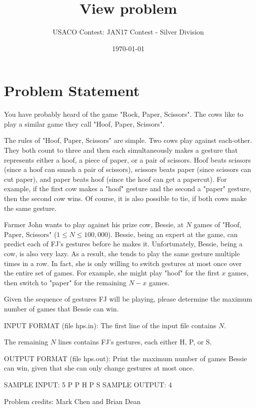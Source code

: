 \documentclass[12pt]{article}
\title{View problem}
\author{USACO Contest: JAN17 Contest - Silver Division}
\date{\today}
\begin{document}
\maketitle

\section*{Problem Statement}

You have probably heard of the game "Rock, Paper, Scissors".  The cows like to
play a similar game they call "Hoof, Paper, Scissors". 

The rules of "Hoof, Paper, Scissors" are simple.  Two cows play against
each-other.  They both count to three and then each simultaneously makes a
gesture that represents either a hoof, a piece of paper, or a pair of scissors. 
Hoof beats scissors (since a hoof can smash a pair of scissors), scissors beats
paper (since scissors can cut paper), and paper beats hoof (since the hoof can
get a papercut).   For example, if the first cow makes a "hoof" gesture and the
second a "paper" gesture, then the second cow wins.  Of course, it is also
possible to tie, if both cows make the same gesture.

Farmer John wants to play against his prize cow, Bessie, at $N$ games of 
"Hoof, Paper, Scissors" ($1 \leq N \leq 100,000$).  Bessie, being an expert at the game, can predict
each of FJ's gestures before he makes it.  Unfortunately, Bessie, being a cow,
is also very lazy.  As a result, she tends to play the same gesture multiple
times in a row.  In fact, she is only willing to switch gestures at most
once over the entire set of games.  For example, she might play "hoof"
for the first $x$ games, then switch to "paper" for the remaining $N-x$
games.

Given the sequence of gestures FJ will be playing, please determine the 
maximum number of games that Bessie can win.

INPUT FORMAT (file hps.in):
The first line of the input file contains $N$. 

The remaining $N$ lines contains FJ's gestures, each either H, P, or S.

OUTPUT FORMAT (file hps.out):
Print the maximum number of games Bessie can win, given that she can only
change gestures at most once.

SAMPLE INPUT:
5
P
P
H
P
S
SAMPLE OUTPUT: 
4

Problem credits: Mark Chen and Brian Dean
\end{document}
